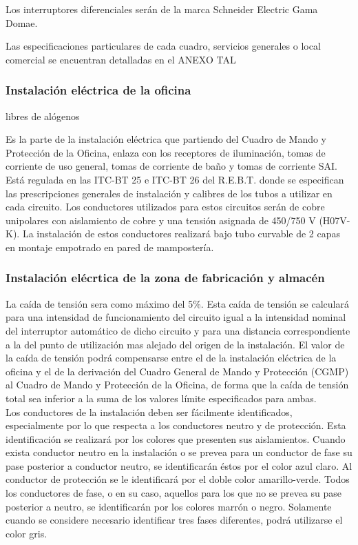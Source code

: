 Los interruptores diferenciales serán de la marca Schneider Electric Gama Domae.

Las especificaciones particulares de cada cuadro, servicios generales o local comercial se encuentran detalladas en el ANEXO TAL

\subsubsection{Instalación eléctrica de la oficina}

libres de alógenos

Es la parte de la instalación eléctrica que partiendo del Cuadro de Mando y Protección de la Oficina, enlaza con los receptores de iluminación, tomas de corriente de uso general, tomas de corriente de baño y tomas de corriente SAI.\\

Está regulada en las ITC-BT 25 e ITC-BT 26 del R.E.B.T. donde se especifican las prescripciones generales de instalación y calibres de los tubos a utilizar en cada circuito. Los conductores utilizados para estos circuitos serán de cobre unipolares con aislamiento de cobre y una tensión asignada de 450/750 V (H07V-K). La instalación de estos conductores realizará bajo tubo curvable de 2 capas en montaje empotrado en pared de mampostería.

\subsubsection{Instalación elécrtica de la zona de fabricación y almacén}






La caída de tensión sera como máximo del 5\%. Esta caída de tensión se calculará para una intensidad de funcionamiento del circuito igual a la intensidad nominal del interruptor automático de dicho circuito y para una distancia correspondiente a la del punto de utilización mas alejado del origen de la instalación. El valor de la caída de tensión podrá compensarse entre el de la instalación eléctrica de la oficina y el de la derivación del Cuadro General de Mando y Protección (CGMP) al Cuadro de Mando y Protección de la Oficina, de forma que la caída de tensión total sea inferior a la suma de los valores límite especificados para ambas.\\

Los conductores de la instalación deben ser fácilmente identificados, especialmente por lo que respecta a los conductores neutro y de protección. Esta identificación se realizará por los colores que presenten sus aislamientos. Cuando exista conductor neutro en la instalación o se prevea para un conductor de fase su pase posterior a conductor neutro, se identificarán éstos por el color azul claro. Al conductor de protección se le identificará por el doble color amarillo-verde. Todos los conductores de fase, o en su caso, aquellos para los que no se prevea su pase posterior a neutro, se identificarán por los colores marrón o negro. Solamente cuando se considere necesario identificar tres fases diferentes, podrá utilizarse el color gris.\\

